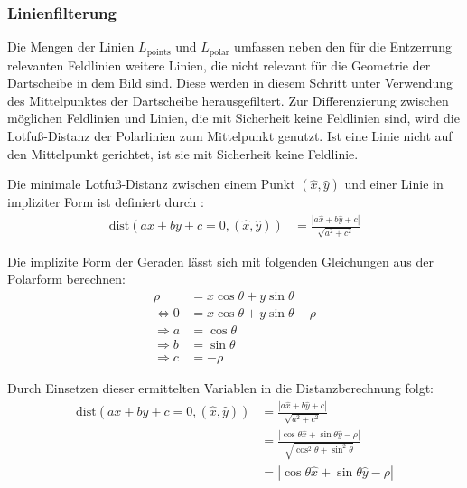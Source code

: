 \subsubsection{Linienfilterung}
\label{sec:linienfilterung}

Die Mengen der Linien $L_\text{points}$ und $L_\text{polar}$ umfassen neben den für die Entzerrung relevanten Feldlinien weitere Linien, die nicht relevant für die Geometrie der Dartscheibe in dem Bild sind. Diese werden in diesem Schritt unter Verwendung des Mittelpunktes der Dartscheibe herausgefiltert. Zur Differenzierung zwischen möglichen Feldlinien und Linien, die mit Sicherheit keine Feldlinien sind, wird die Lotfuß-Distanz der Polarlinien zum Mittelpunkt genutzt. Ist eine Linie nicht auf den Mittelpunkt gerichtet, ist sie mit Sicherheit keine Feldlinie.

Die minimale Lotfuß-Distanz zwischen einem Punkt $(\hat{x}, \hat{y})$ und einer Linie in impliziter Form ist definiert durch \cite{point_line_distance}:
\begin{align*}
    \text{dist}(ax + by + c = 0, (\hat{x}, \hat{y})) & = \frac{| a \hat{x} + b \hat{y} + c|}{\sqrt{a^2+c^2}}
\end{align*}

Die implizite Form der Geraden lässt sich mit folgenden Gleichungen aus der Polarform berechnen:
\begin{align*}
    \rho          & = x \cos{\theta} + y \sin{\theta}        \\
    \iff 0        & = x \cos{\theta} + y \sin{\theta} - \rho \\
    \Rightarrow a & = \cos{\theta}                           \\
    \Rightarrow b & = \sin{\theta}                           \\
    \Rightarrow c & = -\rho
\end{align*}

Durch Einsetzen dieser ermittelten Variablen in die Distanzberechnung folgt:
\begin{align*}
    \text{dist}(ax + by + c = 0, (\hat{x}, \hat{y})) & = \frac{| a \hat{x} + b \hat{y} + c|}{\sqrt{a^2+c^2}}                                                   \\
                                                     & = \frac{| \cos{\theta} \hat{x} + \sin{\theta} \hat{y} - \rho |}{\sqrt{\cos^2{\theta} + \sin^2{\theta}}} \\
                                                     & = | \cos{\theta} \hat{x} + \sin{\theta} \hat{y} - \rho |
\end{align*}

